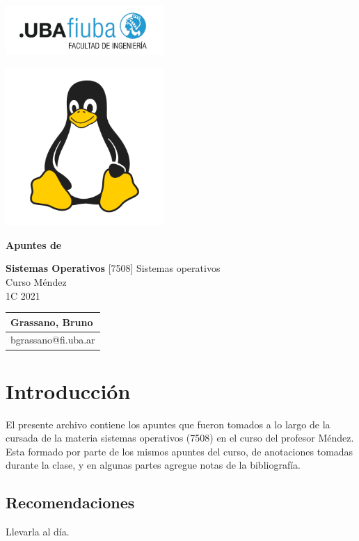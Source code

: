 \documentclass[titlepage,a4paper]{article}
\begin{document}
\begin{titlepage} %
	\hfill\includegraphics[width=6cm]{logofiuba.jpg}
    \centering
    \vfill
    
    \includegraphics[width=6cm]{ImagenesApunte/LogoLinux.png}
    
    \Huge \textbf{Apuntes de}
    
    \Huge \textbf{Sistemas Operativos}
    \vskip2cm
    \Large [7508] Sistemas operativos\\
    Curso Méndez \\
    1C 2021
    \vfill
    \begin{tabular}{ | l | } %
      \hline
      Grassano, Bruno \\ \hline
      bgrassano@fi.uba.ar \\ \hline
  	\end{tabular}
    \vfill
    \vfill
\end{titlepage}

\tableofcontents %

\newpage

\section{Introducción}\label{sec:intro}
El presente archivo contiene los apuntes que fueron tomados a lo largo de la cursada de la materia sistemas operativos (7508) en el curso del profesor Méndez. Esta formado por parte de los mismos apuntes del curso, de anotaciones tomadas durante la clase, y en algunas partes agregue notas de la bibliografía. 

\subsection*{Recomendaciones}
Llevarla al día.
\end{document}
